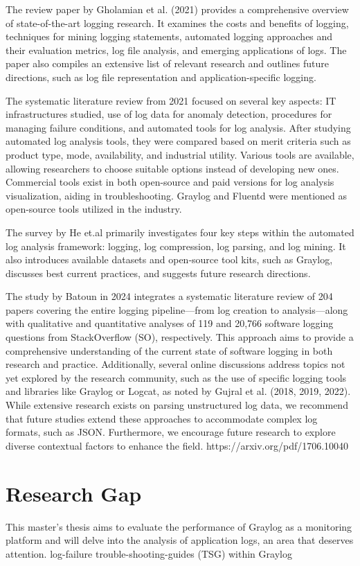 \documentclass[../main.tex]{subfiles}
\begin{document}
The review paper by Gholamian et al. (2021) \cite{gholamian2021comprehensive} provides a comprehensive overview of state-of-the-art logging research. It examines the costs and benefits of logging, techniques for mining logging statements, automated logging approaches and their evaluation metrics, log file analysis, and emerging applications of logs. The paper also compiles an extensive list of relevant research and outlines future directions, such as log file representation and application-specific logging.

The systematic literature review from 2021 \cite{itinfranomaly} focused on several key aspects: IT infrastructures studied, use of log data for anomaly detection, procedures for managing failure conditions, and automated tools for log analysis. After studying automated log analysis tools, they were compared based on merit criteria such as product type, mode, availability, and industrial utility. Various tools are available, allowing researchers to choose suitable options instead of developing new ones. Commercial tools exist in both open-source and paid versions for log analysis visualization, aiding in troubleshooting. Graylog and Fluentd were mentioned as open-source tools utilized in the industry.

The survey by He et.al \cite{surveyloganalysis} primarily investigates four key steps within the automated log analysis framework: logging, log compression, log parsing, and log mining. It also introduces available datasets and open-source tool kits, such as Graylog, discusses best current practices, and suggests future research directions.

The study by Batoun in 2024 \cite{Batoun2024} integrates a systematic literature review of 204 papers covering the entire logging pipeline—from log creation to analysis—along with qualitative and quantitative analyses of 119 and 20,766 software logging questions from StackOverflow (SO), respectively. This approach aims to provide a comprehensive understanding of the current state of software logging in both research and practice. Additionally, several online discussions address topics not yet explored by the research community, such as the use of specific logging tools and libraries like Graylog or Logcat, as noted by Gujral et al. (2018, 2019, 2022). While extensive research exists on parsing unstructured log data, we recommend that future studies extend these approaches to accommodate complex log formats, such as JSON. Furthermore, we encourage future research to explore diverse contextual factors to enhance the field.
https://arxiv.org/pdf/1706.10040

\section{Research Gap}

This master's thesis aims to evaluate the performance of Graylog as a monitoring platform and will delve into the analysis of application logs, an area that deserves attention.
log-failure trouble-shooting-guides (TSG) within Graylog
\end{document}
